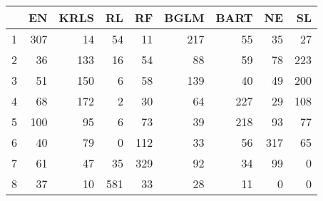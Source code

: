 \begin{table}[ht]
\centering
\begin{tabular}{rrrrrrrrr}
  \hline
 & EN & KRLS & RL & RF & BGLM & BART & NE & SL \\ 
  \hline
1 & 307 &  14 &  54 &  11 & 217 &  55 &  35 &  27 \\ 
  2 &  36 & 133 &  16 &  54 &  88 &  59 &  78 & 223 \\ 
  3 &  51 & 150 &   6 &  58 & 139 &  40 &  49 & 200 \\ 
  4 &  68 & 172 &   2 &  30 &  64 & 227 &  29 & 108 \\ 
  5 & 100 &  95 &   6 &  73 &  39 & 218 &  93 &  77 \\ 
  6 &  40 &  79 &   0 & 112 &  33 &  56 & 317 &  65 \\ 
  7 &  61 &  47 &  35 & 329 &  92 &  34 &  99 &   0 \\ 
  8 &  37 &  10 & 581 &  33 &  28 &  11 &   0 &   0 \\ 
   \hline
\end{tabular}
\end{table}
